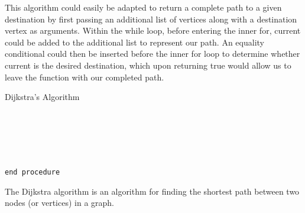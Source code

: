 \documentclass[a4paper]{article}
\begin{document}
This algorithm could easily be adapted to return a complete path to a given destination
by first passing an additional list of vertices along with a destination vertex as arguments.
Within the while loop, before entering the inner for,
current could be added to the additional list to represent our path.
An equality conditional could then be inserted before the inner for loop
to determine whether current is the desired destination, 
which upon returning true would allow us to leave the function with our completed path. 

\newpage


\begin{algorithm}
\caption{Dijkstra's Algorithm}\label{euclid}
\begin{algorithmic}[1]
 \\
 \\

\State{}
\State\quad{}
\State{}

\State{}

 \\

\State{}
\State{}
\State\quad{}
\State\quad{}
\State\quad{}
\State\quad\quad{}
\State\quad\quad{} 
\State\quad\quad{}
\State\quad{}
\State{}
 \\
{\tt end procedure}
\EndProcedure
\end{algorithmic}
\end{algorithm}



The Dijkstra algorithm is an algorithm for finding the shortest path between two nodes (or vertices) in a graph.
\end{document}
